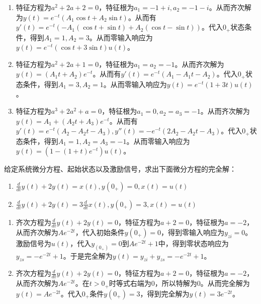 \documentclass[answers]{exam}  %
\begin{document}
\begin{questions}
\begin{solution}
	\begin{enumerate}[(1)]
		\item 特征方程为$a^2+2a+2=0$，特征根为$a_1=-1+i,a_2=-1-i$。从而齐次解为$y(t)=e^{-t}(A_1\cos t+A_2\sin t)$。从而有$y'(t)=e^{-t}(-A_1(\cos t+\sin t)+A_2(\cos t-\sin t))$。代入$0_+$状态条件，得到$A_1=1,A_2=3$。从而零输入响应为$y(t)=e^{-t}(\cos t+3\sin t)u(t)$。
		\item 特征方程为$a^2+2a+1=0$，特征根为$a_1=a_2=-1$。从而齐次解为$y(t)=(A_1t+A_2)e^{-t}$。从而有$y'(t)=e^{-t}(A_1-A_1t-A_2)$。代入$0_+$状态条件，得到$A_1=3,A_2=1$。从而零输入响应为$y(t)=e^{-t}(1+3t)u(t)$。
		\item 特征方程为$a^3+2a^2+a=0$，特征根为$a_1=0,a_2=a_3=-1$。从而齐次解为$y(t)=A_1+(A_2t+A_3)e^{-t}$。从而有$y'(t)=e^{-t}(A_2-A_2t-A_3),y''(t)=-e^{-t}(2A_2-A_2t-A_3)$。代入$0_+$状态条件，得到$A_1=1,A_2=A_3=-1$。从而零输入响应为$y(t)=(1-(1+t)e^{-t})u(t)$。
	\end{enumerate}
\end{solution}


\question 给定系统微分方程、起始状态以及激励信号，求出下面微分方程的完全解：
\begin{enumerate}[(1)]
	\item $\frac{d}{dt}y(t)+2y(t)=x(t),y(0_{+})=0,x(t)=u(t)$
	\item $\frac{d}{dt}y(t)+2y(t)=3\frac{d}{dt}x(t),y(0_{+})=3,x(t)=u(t)$
\end{enumerate}


\begin{solution}
	\begin{enumerate}[(1)]
		\item 齐次方程为$\frac{d}{dt}y(t)+2y(t)=0$，特征方程为$a+2=0$，特征根为$a=-2$，从而齐次解为$Ae^{-2t}$，代入初始条件$y(0_+)=0$，得到零输入响应为$y_{zi}=0$。激励信号为$u(t)$，代入$y_(0_+)=0$到$Ae^{-2t}+1$中，得到零状态响应为$y_{zs}=-e^{-2t}+1$。于是完全解为$y(t)=y_{zi}+y_{zs}=-e^{-2t}+1$。
		\item 齐次方程为$\frac{d}{dt}y(t)+2y(t)=0$，特征方程为$a+2=0$，特征根为$a=-2$，从而齐次解为$Ae^{-2t}$。在$t>0_+$时等式右端为$0$，所以特解为$0$。从而完全解为$y(t)=Ae^{-2t}$。代入$0_+$条件$y(0_{+})=3$，得到完全解为$y(t)=3e^{-2t}$。
	\end{enumerate}
\end{solution}


\end{questions}
\end{document}
